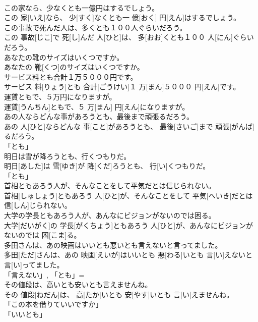 \documentclass[8pt]{extreport}
\begin{document}
\begin{CJK}{UTF8}{min}
\\	この家なら、少なくとも一億円はするでしょう。	
\\	この 家[いえ]なら、 少[すく]なくとも一 億[おく] 円[えん]はするでしょう。	
\\	この事故で死んだ人は、多くとも１００人ぐらいだろう。	
\\	この 事故[じこ]で 死[し]んだ 人[ひと]は、 多[おお]くとも１００ 人[にん]ぐらいだろう。	
\\	あなたの靴のサイズはいくつですか。	
\\	あなたの 靴[くつ]のサイズはいくつですか。	
\\	サービス料とも合計１万５０００円です。	
\\	サービス 料[りょう]とも 合計[ごうけい]１ 万[まん]５０００ 円[えん]です。	
\\	運賃ともで、５万円になりますが。	
\\	運賃[うんちん]ともで、５ 万[まん] 円[えん]になりますが。	
\\	あの人ならどんな事があろうとも、最後まで頑張るだろう。	
\\	あの 人[ひと]ならどんな 事[こと]があろうとも、 最後[さいご]まで 頑張[がんば]るだろう。	
\\	「とも」
\\	明日は雪が降ろうとも、行くつもりだ。	
\\	明日[あした]は 雪[ゆき]が 降[くだ]ろうとも、 行[い]くつもりだ。	
\\	「とも」
\\	首相ともあろう人が、そんなことをして平気だとは信じられない。	
\\	首相[しゅしょう]ともあろう 人[ひと]が、そんなことをして 平気[へいき]だとは 信[しん]じられない。	
\\	大学の学長ともあろう人が、あんなにビジョンがないのでは困る。	
\\	大学[だいがく]の 学長[がくちょう]ともあろう 人[ひと]が、あんなにビジョンがないのでは 困[こま]る。	
\\	多田さんは、あの映画はいいとも悪いとも言えないと言ってました。	
\\	多田[ただ]さんは、あの 映画[えいが]はいいとも 悪[わる]いとも 言[い]えないと 言[い]ってました。	
\\	「言えない」, 「とも」= 
\\	その値段は、高いとも安いとも言えませんね。	
\\	その 値段[ねだん]は、 高[たか]いとも 安[やす]いとも 言[い]えませんね。	
\\	「この本を借りていいですか」 
\\	「いいとも」	

\end{CJK}
\end{document}
